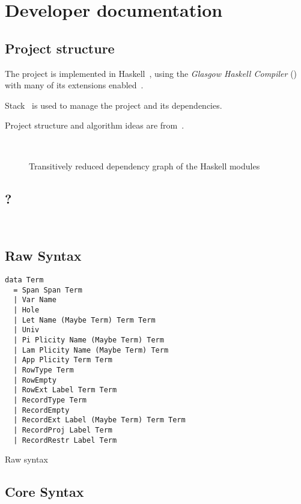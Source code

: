 \chapter{Developer documentation}\label{ch:devdocs}

\section{Project structure}

The project is implemented in Haskell~\cite{haskell2010}, using the
\emph{Glasgow Haskell Compiler} () with many of its extensions
enabled~\cite{ghc}.

Stack~\cite{stack} is used to manage the project and its dependencies.

Project structure and algorithm ideas are from~\cite{elabzoo}.

~\cite{relude}


\begin{figure}
  \resizebox{\textwidth}{!}{}
  \caption{Transitively reduced dependency graph of the Haskell modules
  }\label{fig:modules}
\end{figure}

\section{?}

~\cite{funcdata, optics, inotherwords, prettyprinter}

\section{Raw Syntax}

\begin{listing}
  \begin{verbatim}
data Term
  = Span Span Term
  | Var Name
  | Hole
  | Let Name (Maybe Term) Term Term
  | Univ
  | Pi Plicity Name (Maybe Term) Term
  | Lam Plicity Name (Maybe Term) Term
  | App Plicity Term Term
  | RowType Term
  | RowEmpty
  | RowExt Label Term Term
  | RecordType Term
  | RecordEmpty
  | RecordExt Label (Maybe Term) Term Term
  | RecordProj Label Term
  | RecordRestr Label Term
  \end{verbatim}
  \caption{Raw syntax }\label{lst:raw-adt}
\end{listing}

\section{Core Syntax}

